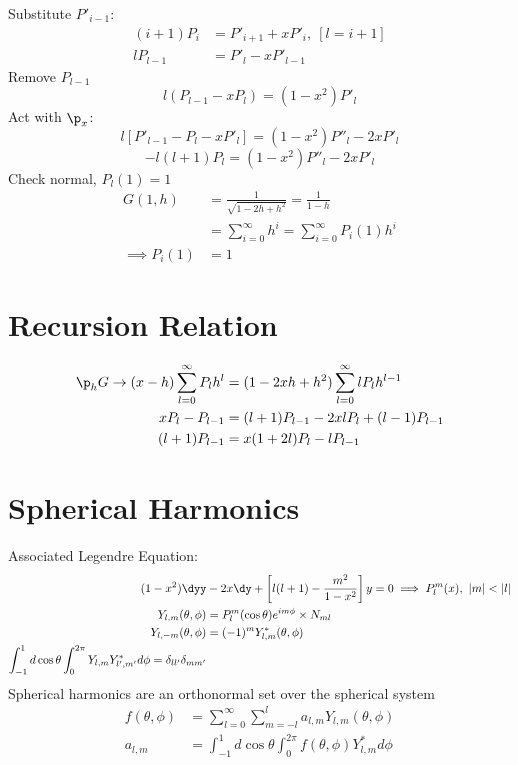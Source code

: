 \documentclass[Maths.tex]{subfiles}
\begin{document}
Substitute $P'_{i-1}$:
\begin{align}
    (i+1)P_i &= P'_{i+1} + xP'_i,~ [l = i+1] \\
    lP_{l-1} &= P'_l - xP'_{l-1}
\end{align}
Remove $P_{l-1}$
\begin{equation}
    \boxed{l(P_{l-1} - xP_l) = (1-x^2)P'_l}
\end{equation}
Act with $\p_x$:
\begin{equation}
    l[P'_{l-1}-P_l -xP'_l] = (1-x^2)P''_l - 2xP'_l
\end{equation}
\begin{equation}
    \boxed{-l(l+1)P_l = (1-x^2)P''_l - 2xP'_l}
\end{equation}
Check normal, $P_l(1) = 1$
\begin{align}
    G(1,h) &= \frac{1}{\sqrt{1-2h+h^2}} = \frac{1}{1-h} \\
    &= \sum_{i=0}^\infty h^i = \sum_{i=0}^\infty P_i(1)h^i \\
    \implies P_i(1) &= 1
\end{align}

\section{Recursion Relation}
\begin{align}
    \p_hG \to (x-h)\sum_{l=0}^\infty P_lh^l &= (1-2xh+h^2)\sum_{l=0}^\infty lP_lh^{l-1} \\
    xP_l - P_{l-1} &= (l+1)P_{l-1} -2xlP_l + (l-1)P_{l-1} \\
    (l+1)P_{l-1} &= x(1+2l)P_l - lP_{l-1}
\end{align}

\section{Spherical Harmonics}
Associated Legendre Equation:
\begin{align}
    (1-x^2)\dyy &- 2x\dy + \left[l(l+1) - \frac{m^2}{1-x^2}\right]y = 0 \implies P_l^m(x),~ |m| < |l| \\
    Y_{l,m}(\theta,\phi) &= P_l^m(\cos\theta)e^{im\phi} \times N_{ml} \\
    Y_{l,-m}(\theta,\phi) &= (-1)^m Y_{l,m}^*(\theta,\phi) \\
    \int_{-1}^1 d\cos\theta \int_0^{2\pi} Y_{l,m}Y_{l',m'}^*d\phi = \delta_{ll'}\delta_{mm'}
\end{align}
Spherical harmonics are an orthonormal set over the spherical system
\begin{align}
    f(\theta,\phi) &= \sum_{l=0}^\infty \sum_{m=-l}^l a_{l,m}Y_{l,m}(\theta,\phi) \\
    a_{l,m} &= \int_{-1}^1 d\cos\theta \int_0^{2\pi} f(\theta,\phi)Y_{l,m}^*d\phi
\end{align}
\end{document}

